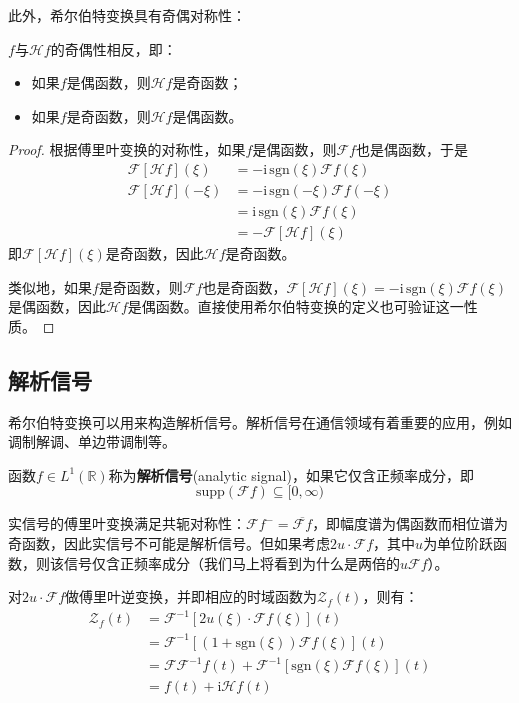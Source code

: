 此外，希尔伯特变换具有奇偶对称性：
\begin{theorem}
    $f$与$\mathcal{H}f$的奇偶性相反，即：
    \begin{itemize}
        \item 如果$f$是偶函数，则$\mathcal{H} f$是奇函数；
        \item 如果$f$是奇函数，则$\mathcal{H} f$是偶函数。
    \end{itemize}
\end{theorem}
\begin{proof}
    根据傅里叶变换的对称性，如果$f$是偶函数，则$\mathcal{F} f$也是偶函数，于是\begin{align*}
        \mathcal{F} [\mathcal{H} f](\xi)&=-\mathrm{i}\,\text{sgn}(\xi)\mathcal{F} f(\xi)\\
        \mathcal{F}[\mathcal{H} f](-\xi)&=-\mathrm{i}\,\text{sgn}(-\xi)\mathcal{F} f(-\xi)\\
        &=\mathrm{i}\,\text{sgn}(\xi)\mathcal{F} f(\xi)\\
        &=-\mathcal{F} [\mathcal{H} f](\xi)
    \end{align*}
    即$\mathcal{F} [\mathcal{H} f](\xi)$是奇函数，因此$\mathcal{H} f$是奇函数。
    
    类似地，如果$f$是奇函数，则$\mathcal{F} f$也是奇函数，$\mathcal{F} [\mathcal{H} f](\xi)=-\mathrm{i}\,\text{sgn}(\xi)\mathcal{F} f(\xi)$是偶函数，因此$\mathcal{H} f$是偶函数。直接使用希尔伯特变换的定义也可验证这一性质。
\end{proof}

\subsection{解析信号}\label{sub:analytic_signal}

希尔伯特变换可以用来构造解析信号。解析信号在通信领域有着重要的应用，例如调制解调、单边带调制等。
\begin{definition}[解析信号]
    函数$f\in L^1(\mathbb{R})$称为\textbf{解析信号}(analytic signal)，如果它仅含正频率成分，即
    \[\text{supp}(\mathcal{F} f)\subseteq[0,\infty)\]
\end{definition}

实信号的傅里叶变换满足共轭对称性：$\mathcal{F} f^-=\overline{\mathcal{F} f}$，即幅度谱为偶函数而相位谱为奇函数，因此实信号不可能是解析信号。但如果考虑$2u\cdot\mathcal{F} f$，其中$u$为单位阶跃函数，则该信号仅含正频率成分（我们马上将看到为什么是两倍的$u\mathcal{F} f$）。

对$2u\cdot\mathcal{F} f$做傅里叶逆变换，并即相应的时域函数为$\mathcal{Z}_f(t)$，则有：
\begin{align*}
    \mathcal{Z}_f(t)&=\mathcal{F} ^{-1}[2u(\xi)\cdot\mathcal{F} f(\xi)](t)\\
    &=\mathcal{F} ^{-1}[(1+\text{sgn}(\xi))\mathcal{F} f(\xi)](t)\\
    &=\mathcal{F} \mathcal{F} ^{-1}f(t)+\mathcal{F} ^{-1}[\text{sgn}(\xi)\mathcal{F} f(\xi)](t)\\
    &=f(t)+\mathrm{i}\mathcal{H} f(t)
\end{align*}

